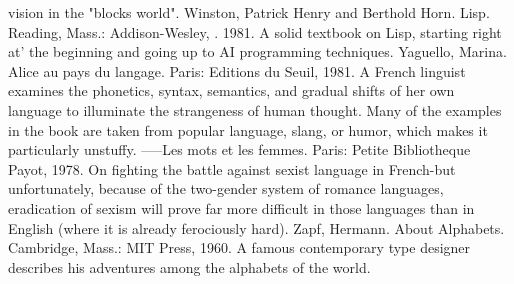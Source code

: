   vision in the "blocks world".
Winston, Patrick Henry and Berthold Horn. Lisp. Reading, Mass.: Addison-Wesley, . 1981. A
  solid textbook on Lisp, starting right at' the beginning and going up to AI programming
  techniques.
Yaguello, Marina. Alice au pays du langage. Paris: Editions du Seuil, 1981. A French linguist
  examines the phonetics, syntax, semantics, and gradual shifts of her own language to
  illuminate the strangeness of human thought. Many of the examples in the book are taken
  from popular language, slang, or humor, which makes it particularly unstuffy.
-----Les mots et les femmes. Paris: Petite Bibliotheque Payot, 1978. On fighting the battle
  against sexist language in French-but unfortunately, because of the two-gender system of
  romance languages, eradication of sexism will prove far more difficult in those languages
  than in English (where it is already ferociously hard).
Zapf, Hermann. About Alphabets. Cambridge, Mass.: MIT Press, 1960. A famous
  contemporary type designer describes his adventures among the alphabets of the world.



